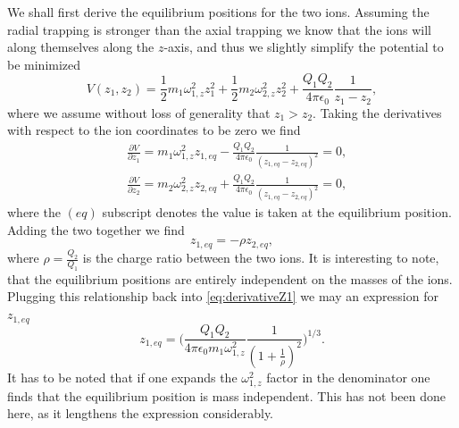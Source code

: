 We shall first derive the equilibrium positions for the two ions. Assuming the radial trapping is stronger than the axial trapping we know that the ions will along themselves along the $z$-axis, and thus we slightly simplify the potential to be minimized
\begin{equation}
    V(z_1,z_2) = \frac{1}{2}m_1\omega_{1,z}^2z_1^2 + \frac{1}{2}m_2\omega_{2,z}^2z_2^2 + \frac{Q_1Q_2}{4\pi\epsilon_0}\frac{1}{z_1-z_2},
\end{equation}
where we assume without loss of generality that $z_1>z_2$. Taking the derivatives with respect to the ion coordinates to be zero we find
\begin{align}
    &\frac{\partial V}{\partial z_{1}} = m_1\omega_{1,z}^2z_{1,eq} - \frac{Q_1Q_2}{4\pi\epsilon_0}\frac{1}{(z_{1,eq}-z_{2,eq})^2}  = 0\label{eq:derivativeZ1},\\
    &\frac{\partial V}{\partial z_{2}} = m_2\omega_{2,z}^2z_{2,eq} + \frac{Q_1Q_2}{4\pi\epsilon_0}\frac{1}{(z_{1,eq}-z_{2,eq})^2} = 0,
\end{align}
where the $(eq)$ subscript denotes the value is taken at the equilibrium position. Adding the two together we find
\begin{equation}
    z_{1,eq} = -\rho z_{2,eq},
\end{equation}
where $\rho = \frac{Q_2}{Q_1}$ is the charge ratio between the two ions. It is interesting to note, that the equilibrium positions are entirely independent on the masses of the ions.
Plugging this relationship back into \cref{eq:derivativeZ1} we may an expression for $z_{1,eq}$
\begin{equation}
    z_{1,eq} =\bigg(\frac{Q_1Q_2}{4\pi\epsilon_0m_1\omega_{1,z}^2}\frac{1}{(1+\frac{1}{\rho})^2}\bigg)^{1/3}.
\end{equation}
It has to be noted that if one expands the $\omega_{1,z}^2$ factor in the denominator one finds that the equilibrium position is mass independent. This has not been done here, as it lengthens the expression considerably.

